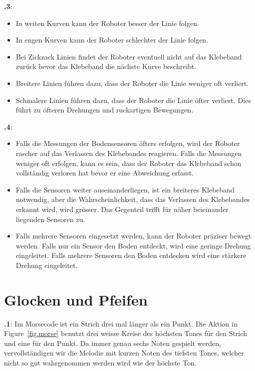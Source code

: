 \documentclass[12pt,a4paper,ngerman]{article}
\begin{document}
\textbf{\thesection.3}:
\begin{itemize}
\item In weiten Kurven kann der Roboter besser der Linie folgen.
\item In engen Kurven kann der Roboter schlechter der Linie folgen.
\item Bei Zickzack Linien findet der Roboter eventuell nicht auf das Klebeband zurück bevor das Klebeband die nächste Kurve beschreibt.
\item Breitere Linien führen dazu, dass der Roboter die Linie weniger oft verliert.
\item Schmalere Linien führen dazu, dass der Roboter die Linie öfter verliert. Dies führt zu öfteren Drehungen und ruckartigen Bewegungen.
\end{itemize}


\textbf{\thesection.4}:
\begin{itemize}
\item Falls die Messungen der Bodensensoren öfters erfolgen, wird der Roboter rascher auf das Verlassen des Klebebandes reagieren. Falls die Messungen weniger oft erfolgen, kann es sein, dass der Roboter das Klebeband schon vollständig verloren hat bevor er eine Abweichung erfasst.
\item Falls die Sensoren weiter auseinanderliegen, ist ein breiteres Klebeband notwendig, aber die Wahrscheinlichkeit, dass das Verlassen des Klebebandes erkannt wird, wird grösser. Das Gegenteil trifft für näher beieinander liegenden Sensoren zu.
\item Falls mehrere Sensoren eingesetzt werden, kann der Roboter präziser bewegt werden. Falls nur ein Sensor den Boden entdeckt, wird eine geringe Drehung eingeleitet. Falls mehrere Sensoren den Boden entdecken wird eine stärkere Drehung eingeleitet.
\end{itemize}


\section{Glocken und Pfeifen}

\textbf{\thesection.1}:
Im Morsecode ist ein Strich drei mal länger als ein Punkt. Die Aktion in Figure~\ref{fig.morse} benutzt drei weisse Kreise des höchsten Tones für den Strich und eine für den Punkt. Da immer genau sechs Noten gespielt werden, vervollständigen wir die Melodie mit kurzen Noten des tiefsten Tones, welcher nicht so gut wahrgenommen werden wird wie der höchste Ton.
\end{document}

